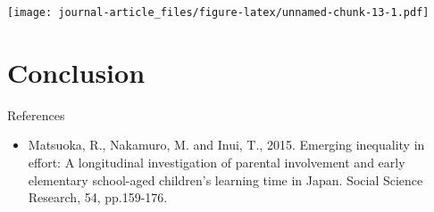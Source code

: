 \documentclass[
]{article}
\newenvironment{Shaded}{\begin{snugshade}}{\end{snugshade}}
\newcommand{\DataTypeTok}[1]{\textcolor[rgb]{0.13,0.29,0.53}{#1}}
\newcommand{\DecValTok}[1]{\textcolor[rgb]{0.00,0.00,0.81}{#1}}
\newcommand{\KeywordTok}[1]{\textcolor[rgb]{0.13,0.29,0.53}{\textbf{#1}}}
\newcommand{\NormalTok}[1]{#1}
\newcommand{\OperatorTok}[1]{\textcolor[rgb]{0.81,0.36,0.00}{\textbf{#1}}}
\newcommand{\StringTok}[1]{\textcolor[rgb]{0.31,0.60,0.02}{#1}}
\providecommand{\tightlist}{%
  \setlength{\itemsep}{0pt}\setlength{\parskip}{0pt}}
\begin{document}
\begin{Shaded}
\end{Shaded}

\texttt{[image: journal-article\_files/figure-latex/unnamed-chunk-13-1.pdf]}

\hypertarget{conclusion}{%
\section{Conclusion}\label{conclusion}}

References

\begin{itemize}
\tightlist
\item
  Matsuoka, R., Nakamuro, M. and Inui, T., 2015. Emerging inequality in
  effort: A longitudinal investigation of parental involvement and early
  elementary school-aged children's learning time in Japan. Social
  Science Research, 54, pp.159-176.
\end{itemize}
\end{document}
